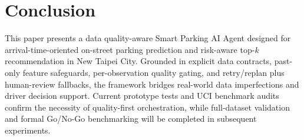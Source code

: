 \documentclass[conference,a4paper]{IEEEtran}
\begin{document}
\section{Conclusion}
This paper presents a data quality-aware Smart Parking AI Agent designed for arrival-time-oriented on-street parking prediction and risk-aware top-$k$ recommendation in New Taipei City. Grounded in explicit data contracts, past-only feature safeguards, per-observation quality gating, and retry/replan plus human-review fallbacks, the framework bridges real-world data imperfections and driver decision support. Current prototype tests and UCI benchmark audits confirm the necessity of quality-first orchestration, while full-dataset validation and formal Go/No-Go benchmarking will be completed in subsequent experiments.



\end{document}

